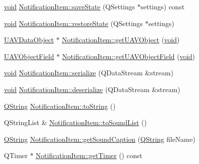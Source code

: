 \begin{DoxyCompactItemize}
\item 
\hyperlink{group___u_a_v_objects_plugin_ga444cf2ff3f0ecbe028adce838d373f5c}{void} \hyperlink{group___notify_plugin_ga9ba0eb664828ae93d16faaa783b77cfc}{\-Notification\-Item\-::save\-State} (\-Q\-Settings $\ast$settings) const 
\item 
\hyperlink{group___u_a_v_objects_plugin_ga444cf2ff3f0ecbe028adce838d373f5c}{void} \hyperlink{group___notify_plugin_gad7dea9a755d75cd820f3b06131f52a1d}{\-Notification\-Item\-::restore\-State} (\-Q\-Settings $\ast$settings)
\item 
\hyperlink{class_u_a_v_data_object}{\-U\-A\-V\-Data\-Object} $\ast$ \hyperlink{group___notify_plugin_ga5f16bd85e4ffd982c71b75abbb00833d}{\-Notification\-Item\-::get\-U\-A\-V\-Object} (\hyperlink{group___u_a_v_objects_plugin_ga444cf2ff3f0ecbe028adce838d373f5c}{void})
\item 
\hyperlink{class_u_a_v_object_field}{\-U\-A\-V\-Object\-Field} $\ast$ \hyperlink{group___notify_plugin_gad80a60dd673d057f2fdd45e79f8b8905}{\-Notification\-Item\-::get\-U\-A\-V\-Object\-Field} (\hyperlink{group___u_a_v_objects_plugin_ga444cf2ff3f0ecbe028adce838d373f5c}{void})
\item 
\hyperlink{group___u_a_v_objects_plugin_ga444cf2ff3f0ecbe028adce838d373f5c}{void} \hyperlink{group___notify_plugin_gad39b4705bd8ee634abb8a8922450613b}{\-Notification\-Item\-::serialize} (\-Q\-Data\-Stream \&stream)
\item 
\hyperlink{group___u_a_v_objects_plugin_ga444cf2ff3f0ecbe028adce838d373f5c}{void} \hyperlink{group___notify_plugin_ga02e47b11a2cd7d0e9b608c497afbf359}{\-Notification\-Item\-::deserialize} (\-Q\-Data\-Stream \&stream)
\item 
\hyperlink{group___u_a_v_objects_plugin_gab9d252f49c333c94a72f97ce3105a32d}{\-Q\-String} \hyperlink{group___notify_plugin_gacced9ea8ef4e62bf9f126766c99514c9}{\-Notification\-Item\-::to\-String} ()
\item 
\-Q\-String\-List \& \hyperlink{group___notify_plugin_ga3fa8d750e630be2b90fbbe2ad536a55b}{\-Notification\-Item\-::to\-Sound\-List} ()
\item 
\hyperlink{group___u_a_v_objects_plugin_gab9d252f49c333c94a72f97ce3105a32d}{\-Q\-String} \hyperlink{group___notify_plugin_gadaf0f176a8851c6a9fe551bf80b61cb4}{\-Notification\-Item\-::get\-Sound\-Caption} (\hyperlink{group___u_a_v_objects_plugin_gab9d252f49c333c94a72f97ce3105a32d}{\-Q\-String} file\-Name)
\item 
\-Q\-Timer $\ast$ \hyperlink{group___notify_plugin_gad0b36630b519b091944bbf350ca8de5f}{\-Notification\-Item\-::get\-Timer} () const 

\end{DoxyCompactItemize}

